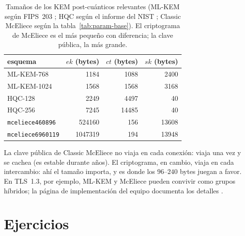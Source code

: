 \documentclass[11pt,a4paper,oneside]{report}
\begin{document}
\begin{table}[htbp]
\centering
\small
\setlength{\tabcolsep}{7pt}
\begin{tabular}{lrrr}
\toprule
esquema & $ek$ (bytes) & $ct$ (bytes) & $sk$ (bytes)\\
\midrule
ML-KEM-768 & 1184 & 1088 & 2400\\
ML-KEM-1024 & 1568 & 1568 & 3168\\
HQC-128 & 2249 & 4497 & 40\\
HQC-256 & 7245 & 14485 & 40\\
\texttt{mceliece460896} & \num{524160} & 156 & \num{13608}\\
\texttt{mceliece6960119} & \num{1047319} & 194 & \num{13948}\\
\bottomrule
\end{tabular}
\caption{Tamaños de los KEM post-cuánticos relevantes (ML-KEM según
FIPS~203 \cite{fips203}; HQC según el informe del NIST \cite{nist8545};
Classic McEliece según la tabla~\ref{tab:param-base}). El criptograma
de McEliece es el más pequeño con diferencia; la clave pública, la más
grande.}
\label{tab:param-contexto}
\end{table}

\begin{practica}
La clave pública de Classic McEliece no viaja en cada conexión: viaja
una vez y se cachea (es estable durante años). El criptograma, en
cambio, viaja en cada intercambio: ahí el tamaño importa, y es donde
los $96$--$240$ bytes juegan a favor. En TLS~1.3, por ejemplo, ML-KEM
y McEliece pueden convivir como grupos híbridos; la página de
implementación del equipo documenta los detalles
\cite{cmimpl}.
\end{practica}

\section{Ejercicios}\label{sec:param-ejercicios}
\end{document}

